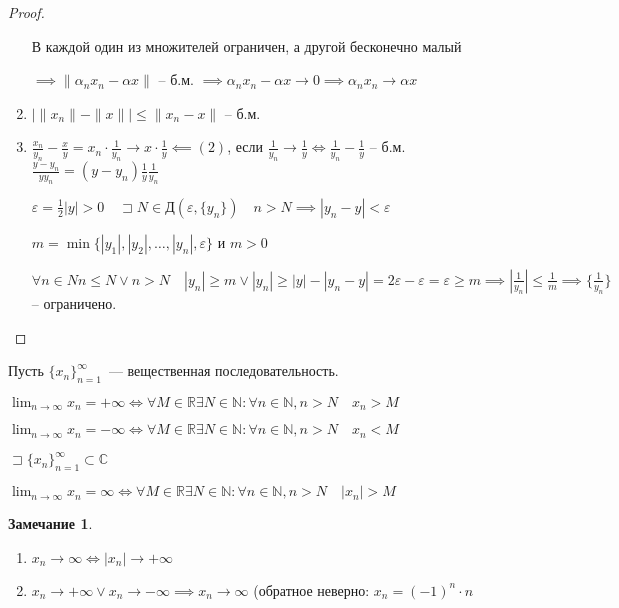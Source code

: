 \documentclass{book}
\newcommand\N{\ensuremath{\mathbb{N}}}
\newcommand\R{\ensuremath{\mathbb{R}}}
\renewcommand\C{\ensuremath{\mathbb{C}}}
\theoremstyle{definition}
\newtheorem*{note}{Замечание}
\begin{document}
\begin{proof}
\begin{enumerate}
            В каждой один из множителей ограничен, а другой бесконечно малый

            $\implies  \|\alpha_nx_n - \alpha x\|$ -- б.м. $\implies  \alpha_nx_n - \alpha x \to  0 \implies  \alpha_nx_n \to  \alpha x$
        \item $\left| \|x_{n} \| - \|x\| \right| \leqslant \|x_{n} -x\|$ -- б.м.

        \item $\frac{x_{n} }{y_{n} } - \frac{x}{y} = x_n\cdot \frac{1}{y_n} \to  x\cdot \frac{1}{y} \impliedby (2)$, если $\frac{1}{y_{n} } \to  \frac{1}{y} \iff  \frac{1}{y_{n} } - \frac{1}{y}$ -- б.м. $\frac{y-y_{n} }{yy_{n} } = (y-y_{n} )\frac{1}{y}\frac{1}{y_{n} }$

        $\varepsilon = \frac{1}{2}|y| >0\quad \sqsupset N \in \text{Д}\left( \varepsilon, \{y_{n} \} \right) \quad n>N \implies  |y_n-y| <\varepsilon$

        $m = \min\{|y_1|, |y_2|, \ldots, |y_n|, \varepsilon\}$ и $m>0$

        $\forall n\in N n\leqslant N \lor n>N\quad |y_n| \geqslant m \lor |y_n| \geqslant |y| - |y_n-y| = 2\varepsilon - \varepsilon = \varepsilon \geqslant m \implies  \left| \frac{1}{y_n} \right| \leqslant \frac{1}{m} \implies \{\frac{1}{y_{n} }\}$ -- ограничено.
        \end{enumerate}
    \end{proof}
    \begin{definition}
        Пусть $\{x_{n}\}_{n=1}^{\infty }$~--- вещественная последовательность.

        $\lim_{n \to \infty} x_n = +\infty  \iff  \forall M\in \R \exists N\in \N : \forall n\in \N , n>N\quad x_n>M$

        $\lim_{n \to \infty} x_n = -\infty  \iff  \forall M\in \R \exists  N\in \N : \forall n\in \N , n>N\quad x_n<M$

        $\sqsupset \{x_n\}_{n=1}^{\infty } \subset \C$

        $\lim_{n \to \infty} x_n = \infty \iff \forall M\in \R\exists N\in \N : \forall n\in \N , n>N\quad |x_n| >M$
    \end{definition}    
    \begin{note}
        \begin{enumerate}
            \item $x_n \to \infty  \iff  |x_n| \to +\infty $
            \item $x_n\to  +\infty  \lor x_n\to -\infty  \implies  x_n \to  \infty $ (обратное неверно: $x_n = (-1)^n\cdot n$
        \end{enumerate}
    \end{note}
\end{document}
